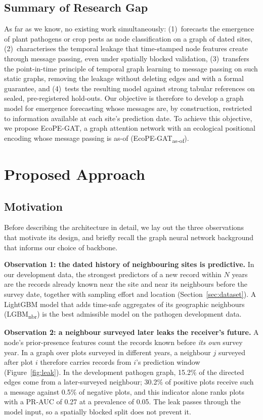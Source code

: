 \documentclass[a4paper,fleqn]{cas-sc}
\newcommand{\Masof}{\mbox{EcoPE-GAT\textsubscript{as-of}}}
\newcommand{\Lnbr}{\mbox{LGBM\textsubscript{nbr}}}
\begin{document}
\subsection{Summary of Research Gap}

As far as we know, no existing work simultaneously: (1)~forecasts the emergence of plant pathogens or crop pests as node classification on a graph of dated sites, (2)~characterises the temporal leakage that time-stamped node features create through message passing, even under spatially blocked validation, (3)~transfers the point-in-time principle of temporal graph learning to message passing on such static graphs, removing the leakage without deleting edges and with a formal guarantee, and (4)~tests the resulting model against strong tabular references on sealed, pre-registered hold-outs. Our objective is therefore to develop a graph model for emergence forecasting whose messages are, by construction, restricted to information available at each site's prediction date. To achieve this objective, we propose EcoPE-GAT, a graph attention network with an ecological positional encoding whose message passing is as-of (\Masof).

\section{Proposed Approach}
\label{sec:approach}

\subsection{Motivation}
\label{sec:motivation}

Before describing the architecture in detail, we lay out the three observations that motivate its design, and briefly recall the graph neural network background that informs our choice of backbone.

\textbf{Observation 1: the dated history of neighbouring sites is predictive.} In our development data, the strongest predictors of a new record within $N$ years are the records already known near the site and near its neighbours before the survey date, together with sampling effort and location (Section~\ref{sec:dataset}). A LightGBM model that adds time-safe aggregates of its geographic neighbours (\Lnbr) is the best admissible model on the pathogen development data.

\textbf{Observation 2: a neighbour surveyed later leaks the receiver's future.} A node's prior-presence features count the records known before \emph{its own} survey year. In a graph over plots surveyed in different years, a neighbour $j$ surveyed after plot $i$ therefore carries records from $i$'s prediction window (Figure~\ref{fig:leak}). In the development pathogen graph, 15.2\% of the directed edges come from a later-surveyed neighbour; 30.2\% of positive plots receive such a message against 0.5\% of negative plots, and this indicator alone ranks plots with a PR-AUC of 0.27 at a prevalence of 0.05. The leak passes through the model input, so a spatially blocked split does not prevent it.
\end{document}
